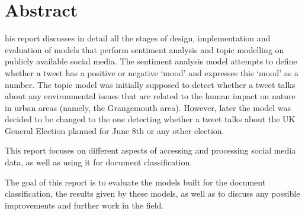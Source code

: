 
\chapter*{Abstract}
\begin{SingleSpace}

his report discusses in detail all the stages of design, implementation and evaluation of models that perform sentiment analysis and topic modelling on publicly available social media. The sentiment analysis model attempts to define whether a tweet has a positive or negative `mood' and expresses this `mood' as a number. The topic model was initially supposed to detect whether a tweet talks about any environmental issues that are related to the human impact on nature in urban areas (namely, the Grangemouth area). However, later the model was decided to be changed to the one detecting whether a tweet talks about the UK General Election planned for June 8th or any other election. 

This report focuses on different aspects of accessing and processing social media data, as well as using it for document classification.

The goal of this report is to evaluate the models built for the document classification, the results given by these models, as well as to discuss any possible improvements and further work in the field.
\end{SingleSpace}